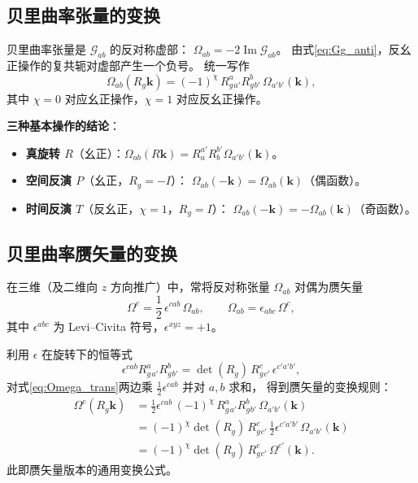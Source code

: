 \subsection{贝里曲率张量的变换}

贝里曲率张量是 \(\mathcal{G}_{ab}\) 的反对称虚部：
\(\Omega_{ab} = -2\operatorname{Im}\mathcal{G}_{ab}\)。
由式\eqref{eq:Gg_anti}，反幺正操作的复共轭对虚部产生一个负号。
统一写作
\begin{equation}
{\Omega_{ab}(R_g\mathbf{k}) = (-1)^{\chi}\,
    R_g^{a}{}_{a'} R_g^{b}{}_{b'}\,\Omega_{a'b'}(\mathbf{k}) },
  \label{eq:Omega_trans}
\end{equation}
其中 \(\chi=0\) 对应幺正操作，\(\chi=1\) 对应反幺正操作。

\textbf{三种基本操作的结论}：
\begin{itemize}
  \item \textbf{真旋转 \(R\)}（幺正）：\(\Omega_{ab}(R\mathbf{k}) = R_a^{a'}R_b^{b'}\Omega_{a'b'}(\mathbf{k})\)。
  \item \textbf{空间反演 \(P\)}（幺正，\(R_g=-I\)）：
        \(\Omega_{ab}(-\mathbf{k}) = \Omega_{ab}(\mathbf{k})\)（偶函数）。
  \item \textbf{时间反演 \(T\)}（反幺正，\(\chi=1\)，\(R_g=I\)）：
        \(\Omega_{ab}(-\mathbf{k}) = -\Omega_{ab}(\mathbf{k})\)（奇函数）。
\end{itemize}

\subsection{贝里曲率赝矢量的变换}

在三维（及二维向 \(z\) 方向推广）中，常将反对称张量 \(\Omega_{ab}\) 对偶为赝矢量
\begin{equation}
  \Omega^c = \frac12\, \epsilon^{cab}\,\Omega_{ab},
  \qquad
  \Omega_{ab} = \epsilon_{abc}\,\Omega^c,
\end{equation}
其中 \(\epsilon^{abc}\) 为 Levi–Civita 符号，\(\epsilon^{xyz}=+1\)。

利用 \(\epsilon\) 在旋转下的恒等式
\[
  \epsilon^{cab} R_g^{a}{}_{a'} R_g^{b}{}_{b'}
  = \det(R_g)\, R_g^{c}{}_{c'}\,\epsilon^{c'a'b'},
\]
对式\eqref{eq:Omega_trans}两边乘 \(\frac12\epsilon^{cab}\) 并对 \(a,b\) 求和，
得到赝矢量的变换规则：
\begin{align}
  \Omega^c(R_g\mathbf{k})
  &= \frac12 \epsilon^{cab}\, (-1)^\chi\, R_g^{a}{}_{a'} R_g^{b}{}_{b'}\,
     \Omega_{a'b'}(\mathbf{k}) \nonumber\\
  &= (-1)^\chi \det(R_g)\, R_g^{c}{}_{c'}\,
     \frac12\epsilon^{c'a'b'}\,\Omega_{a'b'}(\mathbf{k}) \nonumber\\
  &= (-1)^\chi \det(R_g)\, R_g^{c}{}_{c'}\,\Omega^{c'}(\mathbf{k}) .
  \label{eq:Omega_vec}
\end{align}
此即赝矢量版本的通用变换公式。

